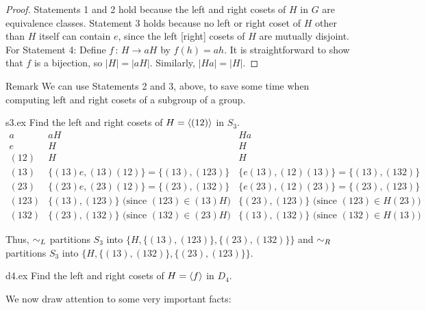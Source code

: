 \begin{proof} Statements 1 and 2 hold because the left and right
cosets of $H$ in $G$ are equivalence classes. Statement 3
holds because no left or right coset of $H$ other than $H$
itself can contain $e$, since the left [right] cosets of $H$
are mutually disjoint. For Statement 4: Define $f\,:\,H\to aH$ by $f(h)=ah$. It is straightforward to show that $f$ is a bijection, so $|H|=|aH|$.  Similarly, $|Ha|=|H|$.\end{proof} \begin{comment} Finally, if $K\leq G$ with $K\subseteq
H$ and $aK=bK$, then $b^{-1}a\in K\subseteq H$ so $a\in bH$,
implying $aH=bH$.\end{comment}


\begin{df}{Remark} We can use Statements 2 and 3, above, to save some
time when computing left and right cosets of a subgroup of a
group.\end{df}

\begin{example}{s3.ex} Find the left and right cosets of $H=\langle(12)\rangle$ in
$S_3$.
$$
\begin{array}{l|l|l}
a& aH & Ha\\ \hline
e&H&H\\
(12)&H&H\\
(13)&\{(13)e,(13)(12)\}=\{(13),(123)\}&\{e(13),(12)(13)\}=\{(13),(132)\}\\
(23)&\{(23)e,(23)(12)\}=\{(23),(132)\}&\{e(23),(12)(23)\}=\{(23),(123)\}\\
 (123)&\{(13),(123)\} \mbox{ (since }(123)\in (13)H)&\{(23),(123)\} \mbox{ (since } (123)\in H(23))\\
 (132)&\{(23),(132)\} \mbox{ (since } (132)\in(23)H)&\{(13),(132)\} \mbox{ (since } (132)\in H(13))
\end{array}$$

Thus, $\sim_L$ partitions $S_3$ into $\{H,\{(13),(123)\},\{(23),
(132)\}\}$ and $\sim_R$ partitions $S_3$ into
$\{H,\{(13),(132)\},\{(23), (123)\}\}$.
\end{example}

\begin{example}{d4.ex} Find the left and right cosets of $H=\langle f\rangle$ in
$D_4$.

 \end{example}

We now draw attention to some very important facts:


